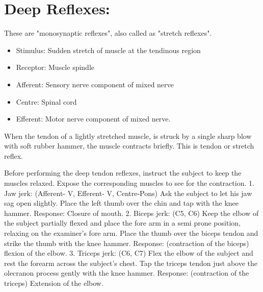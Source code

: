 \documentclass[a4paper,12pt]{book}
\begin{document}
\section*{Deep Reflexes:}
These are "monosynaptic reflexes", also called as "stretch reflexes".
\begin{itemize}
\item{Stimulus: Sudden stretch of muscle at the tendinous region}
\item{Receptor: Muscle spindle}
\item{Afferent: Sensory nerve component of mixed nerve}
\item{Centre: Spinal cord}
\item{Efferent: Motor nerve component of mixed nerve.}
\end{itemize}
\par
When the tendon of a lightly stretched muscle, is struck by a single sharp blow with soft rubber hammer, the muscle contracts briefly. This is tendon or stretch reflex.
\par
Before performing the deep tendon reflexes, instruct the subject to keep the muscles relaxed. Expose the corresponding muscles to see for the contraction.
1. Jaw jerk: (Afferent- V, Efferent- V, Centre-Pons)
	Ask the subject to let his jaw sag open slightly. Place the left thumb over the chin and tap with the knee hammer.
Response: Closure of mouth.
2. Biceps jerk: (C5, C6)
Keep the elbow of the subject partially flexed and place the fore arm in a semi prone position, relaxing on the examiner's fore arm. Place the thumb over the biceps tendon and strike the thumb with the knee hammer.
Response: (contraction of the biceps) flexion of the elbow.
3. Triceps jerk: (C6, C7)
Flex the elbow of the subject and rest the forearm across the subject's chest. Tap the triceps tendon just above the olecranon process gently with the knee hammer.
Response: (contraction of the triceps) Extension of the elbow.
\end{document}
